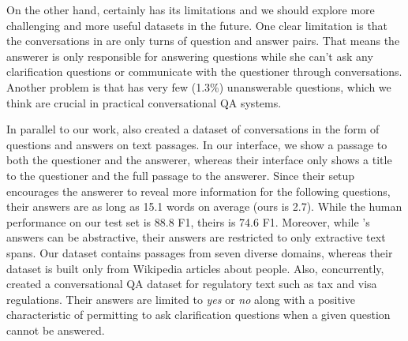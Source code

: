 On the other hand,  certainly has its limitations and we should explore more challenging and more useful datasets in the future. One clear limitation is that the conversations in  are only turns of question and answer pairs. That means the answerer is only responsible for answering questions while she can't ask any clarification questions or communicate with the questioner through conversations.  Another problem is that  has very few (1.3\%) unanswerable questions, which we think are crucial in practical conversational QA systems.


In parallel to our work,  also created a dataset of conversations in the form of questions and answers on text passages. In our interface, we show a passage to both the questioner and the answerer, whereas their interface only shows a title to the questioner and the full passage to the answerer. Since their setup encourages the answerer to reveal more information for the following questions, their answers are as long as 15.1 words on average (ours is 2.7). While the human performance on our test set is 88.8 F1, theirs is 74.6 F1. Moreover, while 's answers can be abstractive, their answers are restricted to only extractive text spans. Our dataset contains passages from seven diverse domains, whereas their dataset is built only from Wikipedia articles about people. Also, concurrently,  created a conversational QA dataset for regulatory text such as tax and visa regulations. Their answers are limited to \textit{yes} or \textit{no} along with a positive characteristic of permitting to ask clarification questions when a given question cannot be answered.
